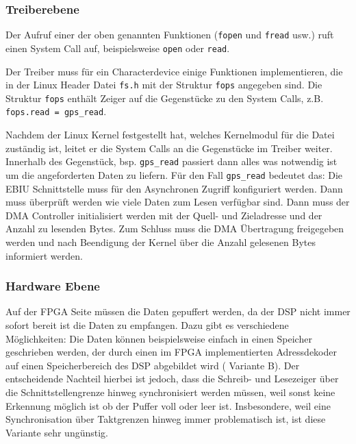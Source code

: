
\subsubsection{Treiberebene}
Der Aufruf einer der oben genannten Funktionen (\lstinline$fopen$ und \lstinline$fread$ usw.) ruft einen System Call auf, beispielsweise  \lstinline$open$ oder \lstinline$read$. 

Der Treiber muss für ein Characterdevice einige Funktionen implementieren, die in der Linux Header Datei \lstinline$fs.h$ mit der Struktur \lstinline$fops$ angegeben sind. Die Struktur \lstinline$fops$ enthält Zeiger auf die Gegenstücke zu den System Calls, z.B. \lstinline$fops.read = gps_read$.

Nachdem der Linux Kernel festgestellt hat, welches Kernelmodul für die Datei zuständig ist, leitet er die System Calls an die Gegenstücke im Treiber weiter. Innerhalb des Gegenstück, bsp. \lstinline$gps_read$ passiert dann alles was notwendig ist um die angeforderten Daten zu liefern. Für den Fall \lstinline$gps_read$ bedeutet das: Die EBIU Schnittstelle muss für den Asynchronen Zugriff konfiguriert werden. Dann muss überprüft werden wie viele Daten zum Lesen verfügbar sind. Dann muss der DMA Controller initialisiert werden mit der Quell- und Zieladresse und der Anzahl zu lesenden Bytes. Zum Schluss muss die DMA Übertragung freigegeben werden und nach Beendigung der Kernel über die Anzahl gelesenen Bytes informiert werden.

\subsubsection{Hardware Ebene}
Auf der FPGA Seite müssen die Daten gepuffert werden, da der DSP nicht immer sofort bereit ist die Daten zu empfangen. Dazu gibt es verschiedene Möglichkeiten: Die Daten können beispielsweise einfach in einen Speicher geschrieben werden, der durch einen im FPGA implementierten Adressdekoder  auf einen Speicherbereich des DSP abgebildet wird ( Variante B). Der entscheidende Nachteil hierbei ist jedoch, dass die Schreib- und Lesezeiger über die Schnittstellengrenze hinweg synchronisiert werden müssen, weil sonst keine Erkennung möglich ist ob der Puffer voll oder leer ist. Insbesondere, weil eine Synchronisation über Taktgrenzen hinweg immer problematisch ist, ist diese Variante sehr ungünstig.

